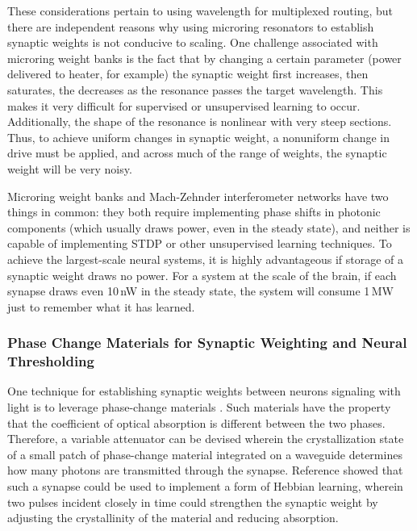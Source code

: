 These considerations pertain to using wavelength for multiplexed routing, but there are independent reasons why using microring resonators to establish synaptic weights is not conducive to scaling. One challenge associated with microring weight banks is the fact that by changing a certain parameter (power delivered to heater, for example) the synaptic weight first increases, then saturates, the decreases as the resonance passes the target wavelength. This makes it very difficult for supervised or unsupervised learning to occur. Additionally, the shape of the resonance is nonlinear with very steep sections. Thus, to achieve uniform changes in synaptic weight, a nonuniform change in drive must be applied, and across much of the range of weights, the synaptic weight will be very noisy.

Microring weight banks and Mach-Zehnder interferometer networks have two things in common: they both require implementing phase shifts in photonic components (which usually draws power, even in the steady state), and neither is capable of implementing STDP or other unsupervised learning techniques. To achieve the largest-scale neural systems, it is highly advantageous if storage of a synaptic weight draws no power. For a system at the scale of the brain, if each synapse draws even 10\,nW in the steady state, the system will consume 1\,MW just to remember what it has learned. 

\cite{tach2015}

\cite{tafe2019}

\subsubsection{Phase Change Materials for Synaptic Weighting and Neural Thresholding}
One technique for establishing synaptic weights between neurons signaling with light is to leverage phase-change materials \cite{chri2017}. Such materials have the property that the coefficient of optical absorption is different between the two phases. Therefore, a variable attenuator can be devised wherein the crystallization state of a small patch of phase-change material integrated on a waveguide determines how many photons are transmitted through the synapse. Reference \cite{chri2017} showed that such a synapse could be used to implement a form of Hebbian learning, wherein two pulses incident closely in time could strengthen the synaptic weight by adjusting the crystallinity of the material and reducing absorption. 

